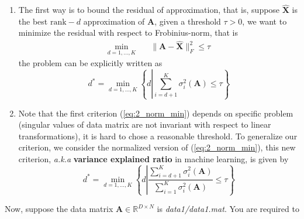 \documentclass[english,onecolumn]{IEEEtran}
\begin{document}
\begin{enumerate}
    \item The first way is to bound the residual of approximation, that is, suppose $\hat{\mathbf{X}}$ is the best $\mathrm{rank}-d$ approximation of $\mathbf{A}$, given a threshold $\tau>0$, we want to minimize the residual with respect to Frobinius-norm, that is
    \begin{align}
        \min_{d=1,\dots,K}&\quad \|\mathbf{A}-\hat{\mathbf{X}}\|_F^2\leq \tau
    \end{align}
    the problem can be explicitly written as
    \begin{equation}\label{eq:2_norm_min}
        d^*=\min_{d=1,\dots,K}\left\{d\left|\sum_{i=d+1}^K\sigma_{i}^2(\mathbf{A})\leq \tau\right.\right\}
    \end{equation}
    
    \item Note that the first criterion (\ref{eq:2_norm_min}) depends on specific problem (singular values of data matrix are not invariant with respect to linear transformations), it is hard to chose a reasonable threshold. To generalize our criterion, we consider the normalized version of (\ref{eq:2_norm_min}), this new criterion, \textit{a.k.a} \textbf{variance explained ratio} in machine learning, is given by
    \begin{equation}\label{eq:accumulated_error}
        d^*=\min_{d=1,\dots,K}\left\{d\left|\frac{\sum_{i=d+1}^K\sigma_{i}^2(\mathbf{A})}{\sum_{i=1}^K\sigma_i^2(\mathbf{A})}\leq \tau\right.\right\}
    \end{equation}
\end{enumerate}
Now, suppose the data matrix $\mathbf{A}\in\mathbb{R}^{D\times N}$ is \emph{data1/data1.mat}. You are required to 
\end{document}

